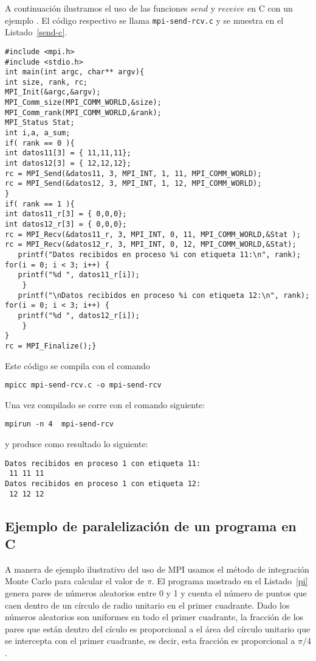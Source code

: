 \documentclass[letter]{jpconf}
\begin{document}
A continuaci\'on ilustramos el uso de las funciones $send$ y $receive$ en C con un ejemplo . El c\'odigo respectivo se llama  \texttt{mpi-send-rcv.c} y se muestra en el Listado~\ref{send-c}.
\begin{lstlisting}[float,floatplacement=H,label=send-c,caption=Listado del programa \texttt{mpi-send-rcv.c} en C]
#include <mpi.h>
#include <stdio.h>
int main(int argc, char** argv){
int size, rank, rc;
MPI_Init(&argc,&argv);
MPI_Comm_size(MPI_COMM_WORLD,&size);
MPI_Comm_rank(MPI_COMM_WORLD,&rank);
MPI_Status Stat;
int i,a, a_sum;
if( rank == 0 ){
int datos11[3] = { 11,11,11};
int datos12[3] = { 12,12,12};
rc = MPI_Send(&datos11, 3, MPI_INT, 1, 11, MPI_COMM_WORLD);
rc = MPI_Send(&datos12, 3, MPI_INT, 1, 12, MPI_COMM_WORLD);
}
if( rank == 1 ){
int datos11_r[3] = { 0,0,0};
int datos12_r[3] = { 0,0,0};
rc = MPI_Recv(&datos11_r, 3, MPI_INT, 0, 11, MPI_COMM_WORLD,&Stat );
rc = MPI_Recv(&datos12_r, 3, MPI_INT, 0, 12, MPI_COMM_WORLD,&Stat);
   printf("Datos recibidos en proceso %i con etiqueta 11:\n", rank);
for(i = 0; i < 3; i++) {
   printf("%d ", datos11_r[i]);
    }
   printf("\nDatos recibidos en proceso %i con etiqueta 12:\n", rank);
for(i = 0; i < 3; i++) {
   printf("%d ", datos12_r[i]);
    }
}
rc = MPI_Finalize();}
\end{lstlisting}


Este c\'odigo se compila con el comando
\color{blue}
\begin{verbatim}
mpicc mpi-send-rcv.c -o mpi-send-rcv
\end{verbatim}
\color{black}

Una vez compilado se corre con el comando siguiente:
\color{blue}
\begin{verbatim}
mpirun -n 4  mpi-send-rcv
\end{verbatim}
\color{black}
y produce como resultado lo siguiente:
\color{brown}
\begin{verbatim}
Datos recibidos en proceso 1 con etiqueta 11:
 11 11 11 
Datos recibidos en proceso 1 con etiqueta 12:
 12 12 12
\end{verbatim}
\color{black}

\subsection{Ejemplo de paralelizaci\'on de un programa en C}

A manera de ejemplo ilustrativo del uso de MPI usamos el m\'etodo de integraci\'on Monte Carlo para calcular el valor de $\pi$. El programa mostrado en el Listado~\ref{pi} genera pares de n\'umeros aleatorios entre 0 y 1 y cuenta el n\'umero de puntos que caen dentro de un c\'irculo de radio unitario en el primer cuadrante. Dado los n\'umeros aleatorios son uniformes en todo el primer cuadrante, la fracci\'on de los pares que est\'an dentro del c\'iculo es proporcional a el \'area del c\'irculo unitario que se intercepta con el primer cuadrante, es decir, esta fracci\'on es proporcional a $\pi/4$.
\end{document}

